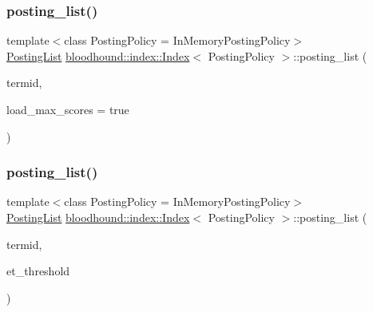 \subsubsection{\texorpdfstring{posting\+\_\+list()}{posting\_list()}\hspace{0.1cm}{\footnotesize\ttfamily [1/2]}}
{\footnotesize\ttfamily template$<$class Posting\+Policy = In\+Memory\+Posting\+Policy$>$ \\
\mbox{\hyperlink{classbloodhound_1_1PostingList}{Posting\+List}} \mbox{\hyperlink{classbloodhound_1_1index_1_1Index}{bloodhound\+::index\+::\+Index}}$<$ Posting\+Policy $>$\+::posting\+\_\+list (\begin{DoxyParamCaption}\item[{\mbox{\hyperlink{structbloodhound_1_1TermId}{Term\+Id}}}]{termid,  }\item[{bool}]{load\+\_\+max\+\_\+scores = {\ttfamily true} }\end{DoxyParamCaption})\hspace{0.3cm}{\ttfamily [inline]}}

\mbox{\label{classbloodhound_1_1index_1_1Index_ac26271e4e2678e77d46017a24ed7eac5}} 
\subsubsection{\texorpdfstring{posting\+\_\+list()}{posting\_list()}\hspace{0.1cm}{\footnotesize\ttfamily [2/2]}}
{\footnotesize\ttfamily template$<$class Posting\+Policy = In\+Memory\+Posting\+Policy$>$ \\
\mbox{\hyperlink{classbloodhound_1_1PostingList}{Posting\+List}} \mbox{\hyperlink{classbloodhound_1_1index_1_1Index}{bloodhound\+::index\+::\+Index}}$<$ Posting\+Policy $>$\+::posting\+\_\+list (\begin{DoxyParamCaption}\item[{\mbox{\hyperlink{structbloodhound_1_1TermId}{Term\+Id}}}]{termid,  }\item[{double}]{et\+\_\+threshold }\end{DoxyParamCaption})\hspace{0.3cm}{\ttfamily [inline]}}

\mbox{\label{classbloodhound_1_1index_1_1Index_ae36f606ee2206c44d44d0a11ae91b04c}} 
